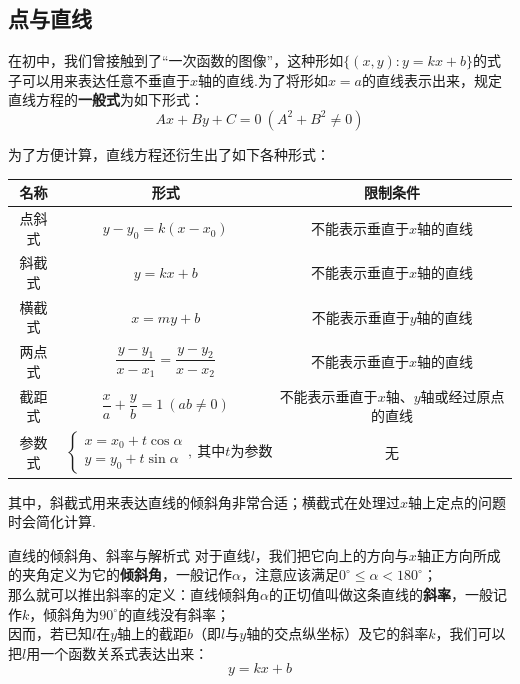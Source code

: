 \documentclass[lang=cn, zihao=5]{elegantbook}
\begin{document}
\subsection{点与直线}

在初中，我们曾接触到了“一次函数的图像”，这种形如$\{ (x,y):y=kx+b \}$的式子可以用来表达任意不垂直于$x$轴的直线.为了将形如$x=a$的直线表示出来，规定直线方程的\textbf{一般式}为如下形式：$$Ax+By+C=0~(A^2+B^2 \neq 0)$$

为了方便计算，直线方程还衍生出了如下各种形式：

\begin{table}[h]
	\centering
	\renewcommand\arraystretch{1.5}
	\begin{tabular}{ccc}
		\toprule
		名称&形式&限制条件 \\
		\midrule
		点斜式 & $y-y_0=k(x-x_0)$ & 不能表示垂直于$x$轴的直线 \\
		斜截式 & $y=kx+b$ & 不能表示垂直于$x$轴的直线 \\
		横截式 & $x=my+b$ & 不能表示垂直于$y$轴的直线 \\
		两点式 & $\dfrac{y-y_1}{x-x_1}=\dfrac{y-y_2}{x-x_2}$ & 不能表示垂直于$x$轴的直线 \\
		截距式 & $\dfrac{x}{a}+\dfrac{y}{b}=1~(ab \neq 0)$ & 不能表示垂直于$x$轴、$y$轴或经过原点的直线 \\
		参数式 & $\begin{cases}
			x=x_0+t\cos \alpha \\
			y=y_0+t\sin \alpha
		\end{cases},~\textit{其中}t\textit{为参数}$ & 无 \\
		\bottomrule
	\end{tabular}
\end{table}

其中，斜截式用来表达直线的倾斜角非常合适；横截式在处理过$x$轴上定点的问题时会简化计算.

\begin{definition}{直线的倾斜角、斜率与解析式}
    对于直线$l$，我们把它向上的方向与$x$轴正方向所成的夹角定义为它的\textbf{倾斜角}，一般记作$\alpha$，注意应该满足$0^{\circ} \leq \alpha < 180^{\circ}$；\\
    那么就可以推出斜率的定义：直线倾斜角$\alpha$的正切值叫做这条直线的\textbf{斜率}，一般记作$k$，倾斜角为$90^{\circ}$的直线没有斜率；\\
    因而，若已知$l$在$y$轴上的截距$b$（即$l$与$y$轴的交点纵坐标）及它的斜率$k$，我们可以把$l$用一个函数关系式表达出来：$$y=kx+b$$
\end{definition}
\end{document}
